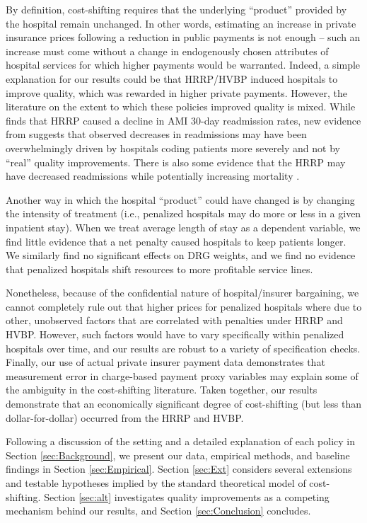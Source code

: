 \documentclass[12pt]{article}
\begin{document}
By definition, cost-shifting requires that the underlying ``product'' provided by the hospital remain unchanged. In other words, estimating an increase in private insurance prices following a reduction in public payments is not enough -- such an increase must come without a change in endogenously chosen attributes of hospital services for which higher payments would be warranted.  Indeed, a simple explanation for our results could be that HRRP/HVBP induced hospitals to improve quality, which was rewarded in higher private payments.  However, the literature on the extent to which these policies improved quality is mixed. While \citet{mellor2016} finds that HRRP caused a decline in AMI 30-day readmission rates, new evidence from \citet{Ibrahim2017} suggests that observed decreases in readmissions may have been overwhelmingly driven by hospitals coding patients more severely and not by ``real'' quality improvements. There is also some evidence that the HRRP may have decreased readmissions while potentially increasing mortality \citep{gupta2017}.

Another way in which the hospital ``product'' could have changed is by changing the intensity of treatment (i.e., penalized hospitals may do more or less in a given inpatient stay). When we treat average length of stay as a dependent variable, we find little evidence that a net penalty caused hospitals to keep patients longer. We similarly find no significant effects on DRG weights, and we find no evidence that penalized hospitals shift resources to more profitable service lines.

Nonetheless, because of the confidential nature of hospital/insurer bargaining, we cannot completely rule out that higher prices for penalized hospitals where due to other, unobserved factors that are correlated with penalties under HRRP and HVBP. However, such factors would have to vary specifically within penalized hospitals over time, and our results are robust to a variety of specification checks.  Finally, our use of actual private insurer payment data demonstrates that measurement error in charge-based payment proxy variables may explain some of the ambiguity in the cost-shifting literature. Taken together, our results demonstrate that an economically significant degree of cost-shifting (but less than dollar-for-dollar) occurred from the HRRP and HVBP.

Following a discussion of the setting and a detailed explanation of each policy in Section \ref{sec:Background}, we present our data, empirical methods, and baseline findings in Section \ref{sec:Empirical}. Section \ref{sec:Ext} considers several extensions and testable hypotheses implied by the standard theoretical model of cost-shifting.  Section \ref{sec:alt} investigates quality improvements as a competing mechanism behind our results, and Section \ref{sec:Conclusion} concludes.
\end{document}
